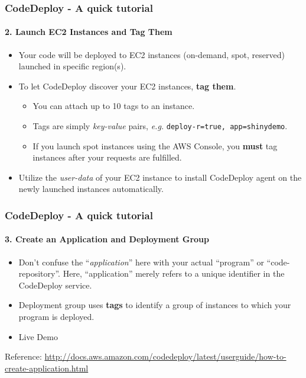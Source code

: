 \documentclass[10pt]{beamer}
\begin{document}
\begin{frame}
    \frametitle{CodeDeploy - A quick tutorial}
    \framesubtitle{2. Launch EC2 Instances and Tag Them}
    \begin{itemize}
        \item Your code will be deployed to EC2 instances (on-demand, spot, reserved) launched in specific region(s).
        \item To let CodeDeploy discover your EC2 instances, {\bf tag them}.
            \begin{itemize}
                \item You can attach up to 10 tags to an instance.
                \item Tags are simply {\it key-value} pairs, {\it e.g.} {\tt deploy-r=true, app=shinydemo}.
                \item If you launch spot instances using the AWS Console, you {\bf must} tag instances after your requests are fulfilled.
            \end{itemize}
        \item Utilize the {\it user-data} of your EC2 instance to install CodeDeploy agent on the newly launched instances automatically.
    \end{itemize}
\end{frame}

\begin{frame}
    \frametitle{CodeDeploy - A quick tutorial}
    \framesubtitle{3. Create an Application and Deployment Group}
    \begin{itemize}
        \item Don't confuse the ``{\it application}'' here with your actual ``program'' or ``code-repository''. Here, ``application'' merely refers to a unique identifier in the CodeDeploy service.
        \item Deployment group uses {\bf tags} to identify a group of instances to which your program is deployed.
        \pause
        \item Live Demo
    \end{itemize}
    
    {\tiny Reference: \url{http://docs.aws.amazon.com/codedeploy/latest/userguide/how-to-create-application.html}}
\end{frame}
\end{document}
